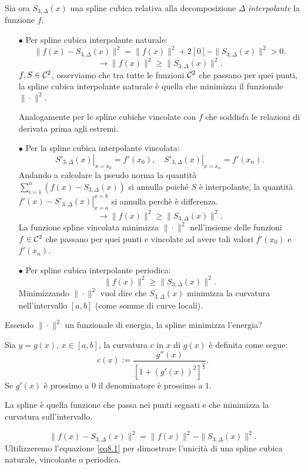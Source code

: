 Sia ora $S_{3,\Delta}(x)$ una spline cubica relativa alla decomposizione
$\Delta$ \emph{interpolante} la funzione $f$.

\begin{itemize}
\item[$\bullet$]Per spline cubica interpolante naturale:
\[
\|f(x) - S_{3,\Delta}(x)\|^2 = \|f(x)\|^2 + 2[0] - \| S_{3,\Delta}(x)\|^2 > 0.
\]
\[\longrightarrow \|f(x)\|^2 \geq \| S_{3,\Delta}(x)\|^2.\]
$f, S \in \mathcal{C}^2$, osserviamo che tra tutte le funzioni $\mathcal{C}^2$ che passano per
quei punti, la spline cubica interpolante naturale è quella che minimizza
il funzionale $\|\cdot\|^2.$

Analogamente per le spline cubiche vincolate con $f$ che soddisfa le relazioni
di derivata prima agli estremi.
\item[$\bullet$]Per la spline cubica interpolante vincolata:
\[
\left.S'_{3,\Delta}(x)\right|_{x = x_{0}} = f'(x_0), \quad
\left.S'_{3,\Delta}(x)\right|_{x = x_{n}} = f'(x_n).
\]
Andando a calcolare la pseudo norma la quantità $\sum_{i=1}^n(f(x) - 
S_{3,\Delta}(x))$ si annulla poiché $S$ è interpolante, la quantità 
$f'(x)- \left.S'_{3,\Delta}(x)\right|_{x = a}^{x= b}$ si annulla perchè è
differenza.
\[\longrightarrow \|f(x)\|^2 \geq \| S_{3,\Delta}(x)\|^2.\]
La funzione spline vincolata minimizza $\|\cdot\|^2$ nell'insieme delle 
funzioni $f \in \mathcal{C}^2$ che passano per quei punti e vincolate ad avere tali
valori $f'(x_0)$ e $f'(x_n)$.
\item[$\bullet$]Per spline cubica interpolante periodica:
\[
\|f(x)\|^2 \geq \| S_{3,\Delta}(x)\|^2.
\]
Minimizzando $\|\cdot\|^2$ vuol dire che $S_{3,\Delta}(x)$ minimizza la 
curvatura nell'intervallo $[a,b]$ (come somme di curve locali).
\end{itemize} 
 
Essendo $\|\cdot\|^2$ un funzionale di energia, la spline minimizza l'energia?

\begin{defi}
Sia $y = g(x)$, $x \in [a,b]$, la curvatura $c$ in $x$ di $g(x)$ è definita 
come segue:
\[
c(x) := \frac{g''(x)}{[1 + (g'(x))^2]^{\frac{3}{2}}}.
\]
Se $g'(x)$ è prossimo a $0$ il denominatore è prossimo a $1$.
\end{defi}

La spline è quella funzione che passa nei punti segnati e che minimizza
la curvatura sull'intervallo.

\begin{equation}\label{eq8.1}
\|f(x) - S_{3,\Delta}(x)\|^2 = \|f(x)\|^2 -\|S_{3,\Delta}(x)\|^2.
\end{equation}
Ultilizzeremo l'equazione \ref{eq8.1} per dimostrare l'unicità di una
spline cubica naturale, vincolante o periodica.

